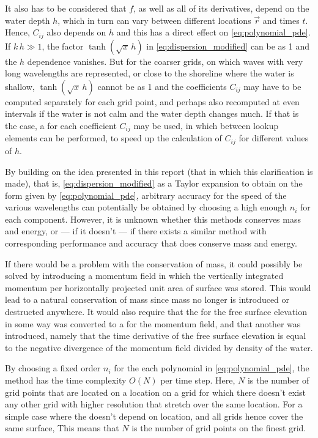 It also has to be considered that $f$, as well as all of its derivatives, depend on the water depth $h$, which in turn can vary between different locations $\vec{r}$ and times $t$. Hence, $C_{ij}$ also depends on $h$ and this has a direct effect on \eqref{eq:polynomial_pde}. If $k\,h \gg 1$, the factor $\tanh(\sqrt{x}\,h)$ in \eqref{eq:dispersion_modified} can be \approximated as 1 and the $h$ dependence vanishes. But for the coarser grids, on which waves with very long wavelengths are represented, or close to the shoreline where the water is shallow, $\tanh(\sqrt{x}\,h)$ cannot be \approximated as 1 and the coefficients $C_{ij}$ may have to be computed separately for each grid point, and perhaps also recomputed at even intervals if the water is not calm and the water depth changes much. If that is the case, a  for each coefficient $C_{ij}$ may be used, in which \interpolation between lookup elements can be performed, to speed up the calculation of $C_{ij}$ for different values of $h$.

By building on the idea presented in this report (that in which this clarification is made), that is, \approximating \eqref{eq:dispersion_modified} as a Taylor expansion to obtain \PDEs on the form given by \eqref{eq:polynomial_pde}, arbitrary accuracy for the speed of the various wavelengths can potentially be obtained by choosing a high enough $n_i$ for each component. However, it is unknown whether this methods conserves mass and energy, or --- if it doesn't --- if there exists a similar method with corresponding performance and accuracy that does conserve mass and energy.

If there would be a problem with the conservation of mass, it could possibly be solved by introducing a momentum field in which the vertically integrated momentum per horizontally projected unit area of surface was stored. This would lead to a natural conservation of mass since mass no longer is introduced or destructed anywhere. It would also require that the \PDE for the free surface elevation in some way was converted to a \PDE for the momentum field, and that another \PDE was introduced, namely that the time derivative of the free surface elevation is equal to the negative divergence of the momentum field divided by density of the water.

By choosing a fixed order $n_i$ for the each polynomial in \eqref{eq:polynomial_pde}, the method has the time complexity $O(N)$ per time step. Here, $N$ is the number of grid points that are located on a location on a grid for which there doesn't exist any other grid with higher resolution that stretch over the same location. For a simple case where the  doesn't depend on location, and all grids hence cover the same surface, This means that $N$ is the number of grid points on the finest grid.

